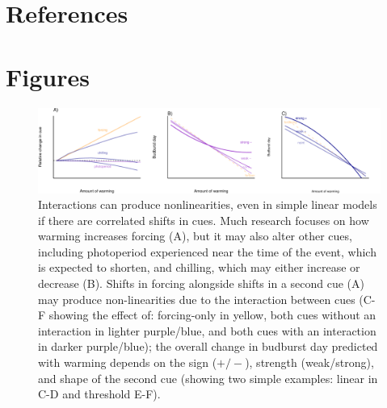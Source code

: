 \documentclass[11pt,letter]{article}
\begin{document}
\clearpage

\section{References}


\clearpage
\section{Figures}
\clearpage
\begin{figure}
\centering
\includegraphics[width=1\textwidth]{..//..//analyses/limitingcues/figures/intxnsims2021photoaltwithchill_3panels.pdf} %
\caption{Interactions can produce nonlinearities, even in simple linear models if there are correlated shifts in cues. Much research focuses on how warming increases forcing (A), but it may also alter other cues, including photoperiod experienced near the time of the event, which is expected to shorten, and chilling, which may either increase or decrease (B). Shifts in forcing alongside shifts in a second cue (A) may produce non-linearities due to the interaction between cues (C-F showing the effect of: forcing-only in yellow, both cues without an interaction in lighter purple/blue, and both cues with an interaction in darker purple/blue); the overall change in budburst day predicted with warming depends on the sign ($+/-$), strength (weak/strong), and shape of the second cue (showing two simple examples: linear in C-D and threshold E-F).}
  \label{fig:intxncues}
\end{figure}
\end{document}
